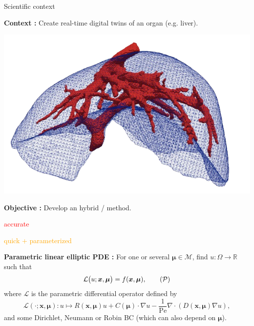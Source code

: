 \begin{frame}{Scientific context}
	\begin{minipage}{0.78\linewidth}
		\textbf{Context :} Create real-time digital twins of an organ (e.g. liver).
	\end{minipage}
	\begin{minipage}{0.18\linewidth}
		\vspace{-20pt}
		\includegraphics[width=0.95\linewidth]{images/intro/liver.png}
	\end{minipage}
	
	\vspace{1pt}
	\textbf{Objective :} Develop an hybrid  /  method.
	
	\vspace{1pt}
	\small
	\hspace{130pt} \begin{minipage}{0.14\linewidth}
		\textcolor{red}{accurate}
	\end{minipage} \hspace{8pt} \begin{minipage}{0.3\linewidth}
		\textcolor{orange}{quick + parameterized}
	\end{minipage}

	\normalsize
	\vspace{5pt}
	\textbf{Parametric linear elliptic PDE :}
	For one or several  $\bm{\mu}\in \mathcal{M}$, find $u: \Omega\to \mathbb{R}$ such that
	\begin{equation}
		\label{eq:ob_pde}
		\mathcal{L}\big(u;\bm{x},\bm{\mu}\big) = f(\bm{x},\bm{\mu}),
		\tag{$\mathcal{P}$}
	\end{equation}
	where $\mathcal{L}$ is the parametric differential operator defined  by
	\begin{equation*}
		\mathcal{L}(\cdot;\bm{x},\bm{\mu}) : u \mapsto R(\bm{x},\bm{\mu}) u + C(\bm{\mu}) \cdot \nabla u - \frac{1}{\text{Pe}} \nabla \cdot (D(\bm{x},\bm{\mu}) \nabla u),
	\end{equation*}
	and some Dirichlet, Neumann or Robin BC (which can also depend on $\bm{\mu}$).
	

\end{frame}
